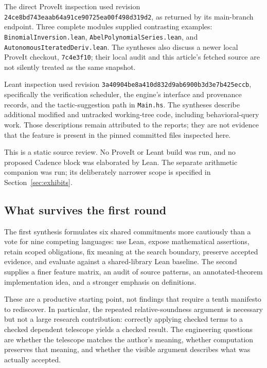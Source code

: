 \documentclass[11pt,letterpaper]{article}
\newcommand{\code}[1]{\nolinkurl{#1}}
\theoremstyle{definition}
\begin{document}
The direct ProveIt inspection used revision
\code{24ce8bd743eaab64a91ce90725ea00f498d319d2}, as returned by its main-branch
endpoint. Three complete modules supplied contrasting examples:
\code{BinomialInversion.lean}, \code{AbelPolynomialSeries.lean}, and
\code{AutonomousIteratedDeriv.lean}\cite{pbinomial,pabel,pode}.
The syntheses also discuss a newer local ProveIt checkout, \code{7c4e3f10}; their
local audit and this article's fetched source are not silently treated as the same
snapshot.

Leant inspection used revision
\code{3a40904be8a410d832d9ab6900b3d3e7b425eccb}, specifically the verification
scheduler, the engine's interface and provenance records, and the tactic-suggestion
path in \code{Main.hs}\cite{lverification,lengine,lmain}. The syntheses describe
additional modified and untracked working-tree code, including behavioral-query
work. Those descriptions remain attributed to the reports; they are not evidence
that the feature is present in the pinned committed files inspected here.

This is a static source review. No ProveIt or Leant build was run, and no proposed
Cadence block was elaborated by Lean. The separate arithmetic companion was run;
its deliberately narrower scope is specified in Section~\ref{sec:exhibits}.

\subsection{What survives the first round}
The first synthesis formulates six shared commitments more cautiously than a vote
for nine competing languages: use Lean, expose mathematical assertions, retain
scoped obligations, fix meaning at the search boundary, preserve accepted evidence,
and evaluate against a shared-library Lean baseline. The second supplies a finer
feature matrix, an audit of source patterns, an annotated-theorem implementation
idea, and a stronger emphasis on definitions\cite{synthesis,review}.

These are a productive starting point, not findings that require a tenth manifesto
to rediscover. In particular, the repeated relative-soundness argument is necessary
but not a large research contribution: correctly applying checked terms to a
checked dependent telescope yields a checked result. The engineering questions
are whether the telescope matches the author's meaning, whether computation
preserves that meaning, and whether the visible argument describes what was
actually accepted.
\end{document}
